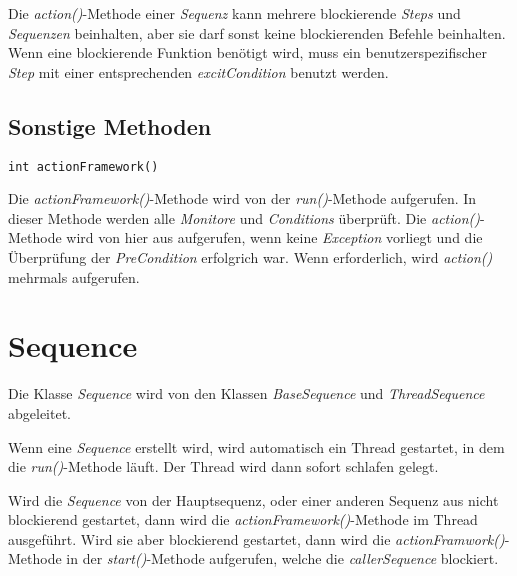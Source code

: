 Die \textit{action()}-Methode einer \textit{Sequenz} kann mehrere blockierende \textit{Steps} und \textit{Sequenzen} beinhalten, aber sie darf sonst keine blockierenden Befehle beinhalten.
Wenn eine blockierende Funktion benötigt wird, muss ein benutzerspezifischer \textit{Step} mit einer entsprechenden \textit{excitCondition} benutzt werden.



\subsection{Sonstige Methoden}
\begin{lstlisting}
int actionFramework()
\end{lstlisting}
Die \textit{actionFramework()}-Methode wird von der \textit{run()}-Methode aufgerufen.
In dieser Methode werden alle \textit{Monitore} und \textit{Conditions} überprüft.
Die \textit{action()}-Methode wird von hier aus aufgerufen, wenn keine \textit{Exception} vorliegt und die Überprüfung der \textit{PreCondition} erfolgrich war.
Wenn erforderlich, wird \textit{action()} mehrmals aufgerufen.



%
%







\section{Sequence}
Die Klasse \textit{Sequence} wird von den Klassen \textit{BaseSequence} und \textit{ThreadSequence} abgeleitet.

Wenn eine \textit{Sequence} erstellt wird, wird automatisch ein Thread gestartet, in dem die \textit{run()}-Methode läuft.
Der Thread wird dann sofort schlafen gelegt.

Wird die \textit{Sequence} von der Hauptsequenz, oder einer anderen Sequenz aus nicht blockierend gestartet, dann wird die \textit{actionFramework()}-Methode im Thread ausgeführt.
Wird sie aber blockierend gestartet, dann wird die \textit{actionFramwork()}-Methode in der \textit{start()}-Methode aufgerufen, welche die \textit{callerSequence} blockiert.



